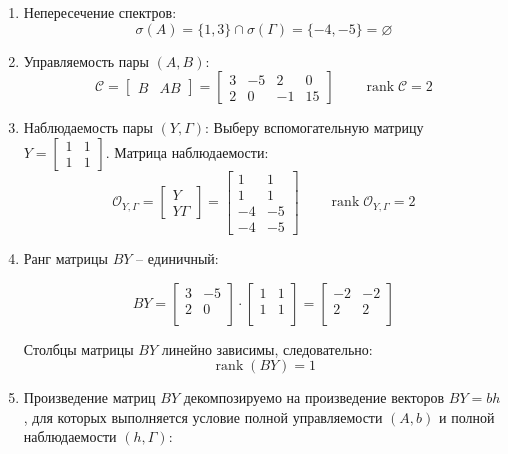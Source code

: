 \documentclass[a4paper,12pt]{article}
\begin{document}
\begin{enumerate}
	\item Непересечение спектров:
	\[
	\sigma(A) = \{1, 3\} \cap \sigma(\Gamma) = \{-4, -5\} = \varnothing
	\]
	
	\item Управляемость пары $(A, B)$:
	\[
	\mathcal{C} = \begin{bmatrix} B & AB \end{bmatrix} = 
	\begin{bmatrix}
		3 & -5 & 2 & 0 \\
		2 & 0 & -1 & 15
	\end{bmatrix}\qquad \operatorname{rank}\mathcal{C} = 2
	\]
	
	\item Наблюдаемость пары $(Y, \Gamma)$:
	Выберу вспомогательную матрицу $Y = \begin{bmatrix} 1 & 1 \\ 1 & 1 \end{bmatrix}$. Матрица наблюдаемости:
	\[
	\mathcal{O}_{Y,\Gamma} = \begin{bmatrix} Y \\ Y\Gamma \end{bmatrix} = 
	\begin{bmatrix}
		1 & 1 \\ 1 & 1 \\ -4 & -5 \\ -4 & -5
	\end{bmatrix} \qquad \operatorname{rank}\mathcal{O}_{Y,\Gamma} = 2
	\]
	
	\item Ранг матрицы \(B Y\) -- единичный:
	
	\[B Y = \begin{bmatrix}
			3&-5 \\ 2&0 \\
		\end{bmatrix} \cdot \begin{bmatrix}
		1&1 \\ 1&1 \\
		\end{bmatrix} = 
		\begin{bmatrix}
			-2&-2 \\ 2&2 \\
		\end{bmatrix}\]
		
	Столбцы матрицы \(BY\) линейно зависимы, следовательно:
	\[
	\operatorname{rank}(BY) = 1
	\]
	
	\item Произведение матриц \(BY\) декомпозируемо на произведение векторов \(BY= bh\), для которых выполняется условие полной управляемости \((A,b)\) и полной наблюдаемости \((h,\Gamma)\):
	

\end{enumerate}
\end{document}
